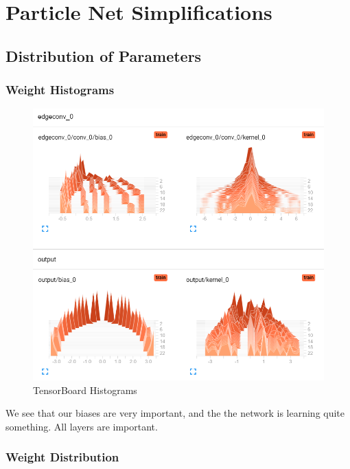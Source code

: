 \chapter{Particle Net Simplifications}



\section{Distribution of Parameters}

\subsection{Weight Histograms}

\begin{figure}[H]
    \centering
    \includegraphics[width=0.8\linewidth]{img/simplify-particle-net/histograms.png}
    \caption{TensorBoard Histograms}
\end{figure}

We see that our biases are very important, and the the network is learning quite something. All layers are important.

\subsection{Weight Distribution}

